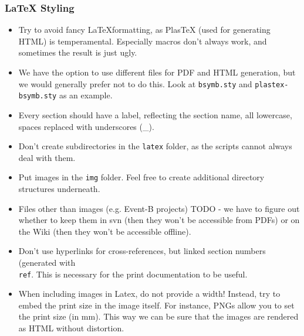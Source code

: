 \subsubsection{\LaTeX{} Styling}

\begin{itemize}
	\item Try to avoid fancy \LaTeX formatting, as PlasTeX (used for generating HTML) is temperamental.  Especially macros don't always work, and sometimes the result is just ugly.
	\item We have the option to use different files for PDF and HTML generation, but we would generally prefer not to do this.  Look at \texttt{bsymb.sty} and \texttt{plastex-bsymb.sty} as an example.
	\item Every section should have a label, reflecting the section name, all lowercase, spaces replaced with underscores (\_).
	\item Don't create subdirectories in the \texttt{latex} folder, as the scripts cannot always deal with them.
	\item Put images in the \texttt{img} folder.  Feel free to create additional directory structures underneath.
	\item Files other than images (e.g. Event-B projects) TODO - we have to figure out whether to keep them in svn (then they won't be accessible from PDFs) or on the Wiki (then they won't be accessible offline).
	\item Don't use hyperlinks for cross-references, but linked section numbers (generated with \texttt{\\ref{}}.  This is necessary for the print documentation to be useful.
	\item When including images in Latex, do not provide a width!  Instead, try to embed the print size in the image itself.  For instance, PNGs allow you to set the print size (in mm).  This way we can be sure that the images are rendered as HTML without distortion.
\end{itemize}

